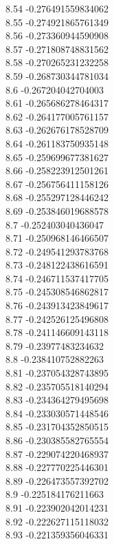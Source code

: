 {8.54	-0.276491559834062\\
8.55	-0.274921865761349\\
8.56	-0.273360944590908\\
8.57	-0.271808748831562\\
8.58	-0.270265231232258\\
8.59	-0.268730344781034\\
8.6	-0.267204042704003\\
8.61	-0.265686278464317\\
8.62	-0.264177005761157\\
8.63	-0.262676178528709\\
8.64	-0.261183750935148\\
8.65	-0.259699677381627\\
8.66	-0.258223912501261\\
8.67	-0.256756411158126\\
8.68	-0.255297128446242\\
8.69	-0.253846019688578\\
8.7	-0.252403040436047\\
8.71	-0.250968146466507\\
8.72	-0.249541293783768\\
8.73	-0.248122438616591\\
8.74	-0.246711537417705\\
8.75	-0.245308546862817\\
8.76	-0.243913423849617\\
8.77	-0.242526125496808\\
8.78	-0.241146609143118\\
8.79	-0.23977483234632\\
8.8	-0.238410752882263\\
8.81	-0.237054328743895\\
8.82	-0.235705518140294\\
8.83	-0.234364279495698\\
8.84	-0.233030571448546\\
8.85	-0.231704352850515\\
8.86	-0.230385582765554\\
8.87	-0.229074220468937\\
8.88	-0.227770225446301\\
8.89	-0.226473557392702\\
8.9	-0.225184176211663\\
8.91	-0.223902042014231\\
8.92	-0.222627115118032\\
8.93	-0.221359356046331\\
}
